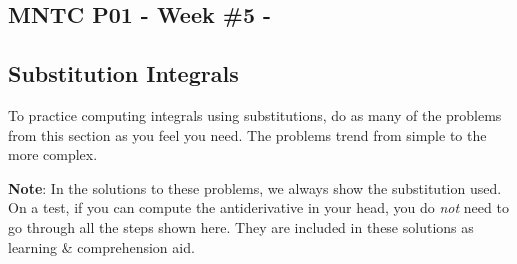 


\usepackage{bbding} %


\newcommand{\ub}{\underbrace}

\begin{center}
\subsection*{MNTC P01 - Week \#5 - \WeekTitleFive}
\end{center}


\subsection*{Substitution Integrals}

\begin{Question}
  To practice computing integrals using substitutions, do as many of
  the problems from this section as you feel you need. The problems
  trend from simple to the more complex.
  
{\bf Note}: In the solutions to these problems, we always show the
  substitution used.  On a test, if you can compute the
  antiderivative in your head, you do {\em not} need to go through
  all the steps shown here.  They are included in these solutions as
  learning \& comprehension aid.
\end{Question}

